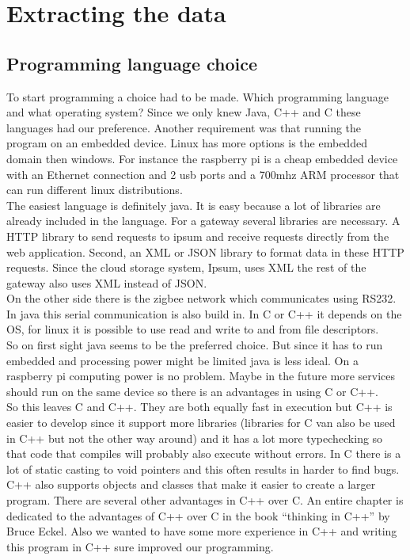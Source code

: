 \section{Extracting the data}
\label{extracting}
\subsection{Programming language choice}
To start programming a choice had to be made. Which programming language and what operating system? Since we only knew Java, C++ and C these languages had our preference. Another requirement was that running the program on an embedded device. Linux has more options is the embedded domain then windows. For instance the raspberry pi is a cheap embedded device with an Ethernet connection and 2 usb ports and a 700mhz ARM processor that can run different linux distributions.\\
The easiest language is definitely java. It is easy because a lot of libraries are already included in the language. For a gateway several libraries are necessary. A HTTP library to send requests to ipsum and receive requests directly from the web application. Second, an XML or JSON library to format data in these HTTP requests. Since the cloud storage system, Ipsum, uses XML the rest of the gateway also uses XML instead of JSON.\\
On the other side there is the zigbee network which communicates using RS232. In java this serial communication is also build in. In C or C++ it depends on the OS, for linux it is possible to use read and write to and from file descriptors.\\
So on first sight java seems to be the preferred choice. But since it has to run embedded and processing power might be limited java is less ideal. On a raspberry pi computing power is no problem. Maybe in the future more services should run on the same device so there is an advantages in using C or C++.\\
So this leaves C and C++. They are both equally fast in execution but C++ is easier to develop since  it support more libraries (libraries for C van also be used in C++ but not the other way around) and it has a lot more typechecking so that code that compiles will probably also execute without errors. In C there is a lot of static casting to void pointers and this often results in harder to find bugs. C++ also supports objects and classes that make it easier to create a larger program. There are several other advantages in C++ over C. An entire chapter is dedicated to the advantages of C++ over C in the book “thinking in C++” by Bruce Eckel. Also we wanted to have some more experience in C++ and writing this program in C++ sure improved our programming.

